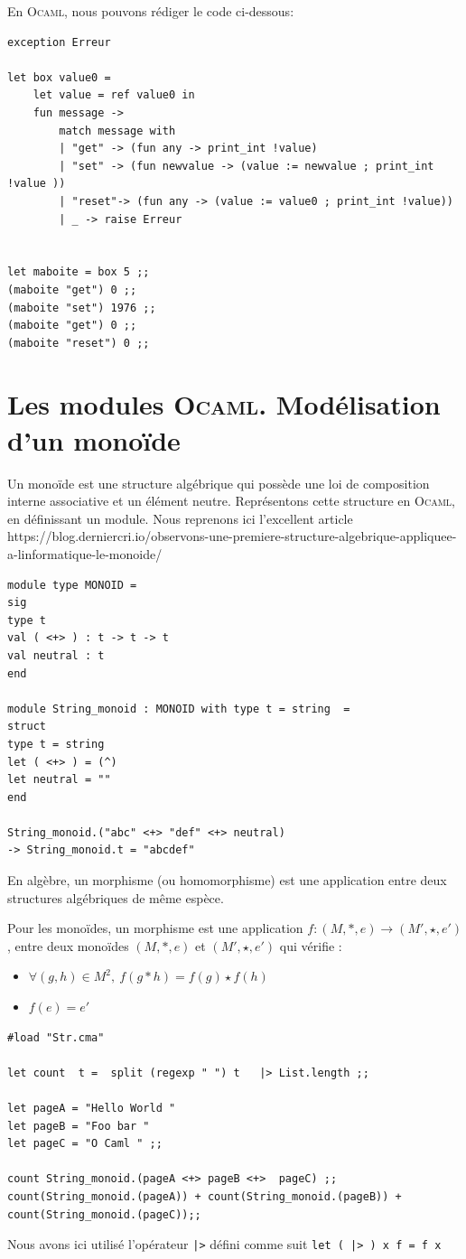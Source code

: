 En \textsc{Ocaml}, nous pouvons rédiger le code ci-dessous:
\begin{Verbatim}
exception Erreur

let box value0 =
	let value = ref value0 in
	fun message ->
		match message with
		| "get" -> (fun any -> print_int !value)
		| "set" -> (fun newvalue -> (value := newvalue ; print_int !value ))
		| "reset"-> (fun any -> (value := value0 ; print_int !value))
		| _ -> raise Erreur
		
		
let maboite = box 5 ;;
(maboite "get") 0 ;;
(maboite "set") 1976 ;;
(maboite "get") 0 ;;
(maboite "reset") 0 ;;
\end{Verbatim}

\section{Les modules \textsc{Ocaml}. Modélisation d'un monoïde}
Un monoïde est une structure algébrique qui possède une loi de composition
interne associative et un élément neutre.
Représentons cette structure en \textsc{Ocaml}, en définissant un module.
Nous reprenons ici l'excellent article 
https://blog.derniercri.io/observons-une-premiere-structure-algebrique-appliquee-a-linformatique-le-monoide/
\begin{Verbatim}
module type MONOID =
sig
type t
val ( <+> ) : t -> t -> t
val neutral : t	
end

module String_monoid : MONOID with type t = string  =
struct
type t = string
let ( <+> ) = (^)
let neutral = ""
end

String_monoid.("abc" <+> "def" <+> neutral)
-> String_monoid.t = "abcdef"	
\end{Verbatim}

En algèbre, un morphisme (ou homomorphisme) est une application entre deux structures algébriques
de même espèce.

Pour les  monoïdes, un morphisme est une application 
$f:(M,*,e)\longrightarrow (M',\star ,e')$ , entre deux monoïdes $ (M,*,e)$ et 
$(M',\star , e')$ qui vérifie :
\begin{itemize}
	\item $\forall (g,h)\in M^{2},~f(g*h)=f(g)\star f(h)$
	\item $f(e)=e'$
\end{itemize}
\begin{Verbatim}
#load "Str.cma"

let count  t =  split (regexp " ") t   |> List.length ;;

let pageA = "Hello World "
let pageB = "Foo bar "
let pageC = "O Caml " ;;

count String_monoid.(pageA <+> pageB <+>  pageC) ;;
count(String_monoid.(pageA)) + count(String_monoid.(pageB)) + count(String_monoid.(pageC));;
\end{Verbatim}
Nous avons ici utilisé l'opérateur \verb+|>+ défini comme suit \verb+let ( |> ) x f = f x+

